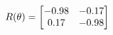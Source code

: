 \documentclass[preview]{standalone}
\begin{document}
\begin{align*}
\special{dvisvgm:raw <g id='unique000'>}R(\theta) = \begin{bmatrix}-0.98 & -0.17\\0.17 & -0.98\end{bmatrix}\special{dvisvgm:raw </g>}
\end{align*}
\end{document}
